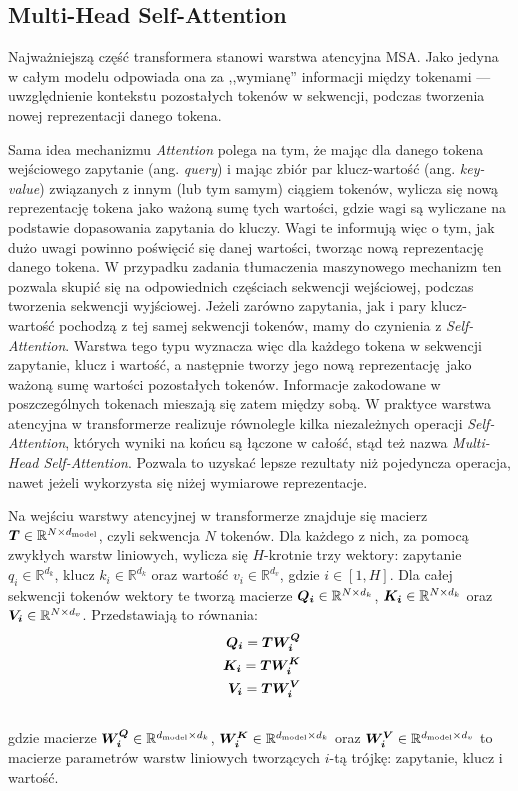 \subsection{Multi-Head Self-Attention}

Najważniejszą część transformera stanowi warstwa atencyjna MSA. Jako jedyna w całym modelu
odpowiada ona za ,,wymianę'' informacji między tokenami --- uwzględnienie kontekstu pozostałych
tokenów w sekwencji, podczas tworzenia nowej reprezentacji danego tokena.

Sama idea mechanizmu \emph{Attention} polega na tym, że mając dla danego tokena wejściowego
zapytanie (ang. \emph{query}) i mając zbiór par klucz-wartość (ang. \emph{key-value}) związanych z
innym (lub tym samym) ciągiem tokenów, wylicza się nową reprezentację tokena jako ważoną sumę tych
wartości, gdzie wagi są wyliczane na podstawie dopasowania zapytania do kluczy. Wagi te informują
więc o tym, jak dużo uwagi powinno poświęcić się danej wartości, tworząc nową reprezentację danego
tokena. W przypadku zadania tłumaczenia maszynowego mechanizm ten pozwala skupić się na
odpowiednich częściach sekwencji wejściowej, podczas tworzenia sekwencji wyjściowej. Jeżeli zarówno
zapytania, jak i pary klucz-wartość pochodzą z tej samej sekwencji tokenów, mamy do czynienia z
\emph{Self-Attention}. Warstwa tego typu wyznacza więc dla każdego tokena w sekwencji zapytanie,
klucz i wartość, a następnie tworzy jego nową reprezentację jako ważoną sumę wartości pozostałych
tokenów. Informacje zakodowane w poszczególnych tokenach mieszają się zatem między sobą. W praktyce
warstwa atencyjna w transformerze realizuje równolegle kilka niezależnych operacji
\emph{Self-Attention}, których wyniki na końcu są łączone w całość, stąd też nazwa \emph{Multi-Head
Self-Attention}. Pozwala to uzyskać lepsze rezultaty niż pojedyncza operacja, nawet jeżeli
wykorzysta się niżej wymiarowe reprezentacje.

Na wejściu warstwy atencyjnej w transformerze znajduje się macierz
$\boldsymbol{T} \in \mathbb{R}^{N \times d_{\mathrm{model}}}$, czyli sekwencja $N$ tokenów. Dla każdego z nich, za pomocą
zwykłych warstw liniowych, wylicza się $H$-krotnie trzy wektory: zapytanie $q_i \in
\mathbb{R}^{d_k}$, klucz $k_i \in \mathbb{R}^{d_k}$ oraz wartość $v_i \in \mathbb{R}^{d_v}$, gdzie
$i \in [1, H]$. Dla całej sekwencji tokenów wektory te tworzą macierze $\boldsymbol{Q_i} \in \mathbb{R}^{N \times d_k}$,
$\boldsymbol{K_i} \in \mathbb{R}^{N \times d_k}$ oraz $\boldsymbol{V_i} \in \mathbb{R}^{N \times d_v}$. Przedstawiają to równania:
\begin{eqnarray}
    \boldsymbol{Q_i} = \boldsymbol{T} \boldsymbol{W_i^Q} \\\
    \boldsymbol{K_i} = \boldsymbol{T} \boldsymbol{W_i^K} \\\
    \boldsymbol{V_i} = \boldsymbol{T} \boldsymbol{W_i^V} \\\
\end{eqnarray}
gdzie macierze $\boldsymbol{W_i^Q} \in \mathbb{R}^{d_{\mathrm{model}} \times d_k}$,
$\boldsymbol{W_i^K} \in \mathbb{R}^{d_{\mathrm{model}} \times d_k}$ oraz $\boldsymbol{W_i^V} \in \mathbb{R}^{d_{\mathrm{model}} \times d_v}$ to
macierze parametrów warstw liniowych tworzących $i$-tą trójkę: zapytanie, klucz i wartość.


